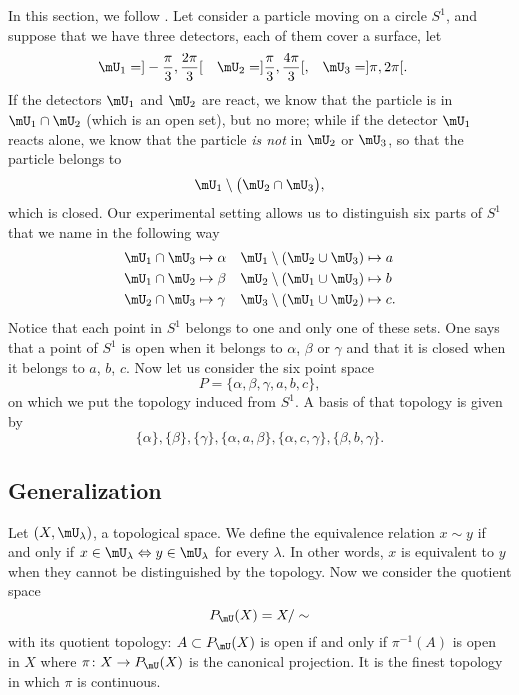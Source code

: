 In this section, we follow \cite{Landi}. Let consider a particle moving on a circle $S^1$, and suppose that we have three detectors, each of them cover a surface, let
\begin{align*}
\mU_1&=]-\frac{ \pi }{ 3 },\frac{ 2\pi }{ 3 }[&\mU_2&=]\frac{ \pi }{ 3 },\frac{ 4\pi }{ 3 }[,&\mU_3&=]\pi,2\pi[.
\end{align*}
If the detectors $\mU_1$ and $\mU_2$ are react, we know that the particle is in $\mU_1\cap\mU_2$ (which is an open set), but no more; while if the detector $\mU_1$ reacts alone, we know that the particle \emph{is not} in $\mU_2$ or $\mU_3$, so that the particle belongs to
\[
  \mU_1\setminus\big( \mU_2\cap\mU_3 \big),
\]
which is closed. Our experimental setting allows us to distinguish six parts of $S^1$ that we name in the following way
\begin{align*}
\mU_1\cap\mU_3&\mapsto \alpha		&\mU_1\setminus (\mU_2\cup\mU_3)&\mapsto a\\
\mU_1\cap\mU_2&\mapsto \beta		&\mU_2\setminus (\mU_1\cup\mU_3)&\mapsto b\\
\mU_2\cap\mU_3&\mapsto \gamma		&\mU_3\setminus (\mU_1\cup\mU_2)&\mapsto c.
\end{align*}
Notice that each point in $S^1$ belongs to one and only one of these sets. One says that a point of $S^1$ is open when it belongs to $\alpha$, $\beta$ or $\gamma$ and that it is closed when it belongs to $a$, $b$, $c$. Now let us consider the six point space
\[
  P=\{ \alpha,\beta,\gamma,a,b,c \},
\]
on which we put the topology induced from $S^1$. A basis of that topology is given by
\[
  \{ \alpha \},\{ \beta \},\{ \gamma \},\{ \alpha,a,\beta \},\{ \alpha,c,\gamma \},\{ \beta,b,\gamma \}.
\]

\subsection{Generalization}

Let $(X,\mU_{\lambda})$, a topological space. We define the equivalence relation $x\sim y$ if and only if $x\in\mU_{\lambda}\Leftrightarrow y\in\mU_{\lambda}$ for every $\lambda$. In other words, $x$ is equivalent to $y$ when they cannot be distinguished by the topology. Now we consider the quotient space
\[
  P_{\mU}(X)=X/\sim
\]
with its quotient topology: $A\subset P_{\mU}(X)$ is open if and only if $\pi^{-1}(A)$ is open in $X$ where $\pi\colon X\to P_{\mU}(X)$ is the canonical projection. It is the finest topology in which $\pi$ is continuous.

